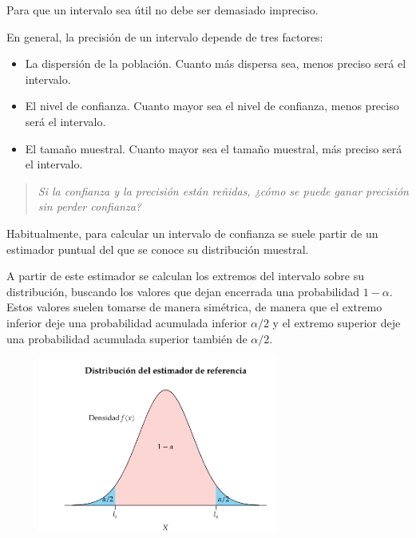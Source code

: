\documentclass[
  a4paper,
]{scrreport}
\theoremstyle{definition}
\theoremstyle{definition}
\theoremstyle{plain}
\theoremstyle{remark}
\begin{document}
Para que un intervalo sea útil no debe ser demasiado impreciso.

En general, la precisión de un intervalo depende de tres factores:

\begin{itemize}
\item
  La dispersión de la población. Cuanto más dispersa sea, menos preciso
  será el intervalo.
\item
  El nivel de confianza. Cuanto mayor sea el nivel de confianza, menos
  preciso será el intervalo.
\item
  El tamaño muestral. Cuanto mayor sea el tamaño muestral, más preciso
  será el intervalo.
\end{itemize}

\begin{quote}
\emph{Si la confianza y la precisión están reñidas, ¿cómo se puede ganar
precisión sin perder confianza?}
\end{quote}

Habitualmente, para calcular un intervalo de confianza se suele partir
de un estimador puntual del que se conoce su distribución muestral.

A partir de este estimador se calculan los extremos del intervalo sobre
su distribución, buscando los valores que dejan encerrada una
probabilidad \(1-\alpha\). Estos valores suelen tomarse de manera
simétrica, de manera que el extremo inferior deje una probabilidad
acumulada inferior \(\alpha/2\) y el extremo superior deje una
probabilidad acumulada superior también de \(\alpha/2\).

\begin{figure}

{\centering \includegraphics[width=0.7\textwidth,height=\textheight]{img/estimacion/extremos-intervalos.pdf}

}

\end{figure}
\end{document}
